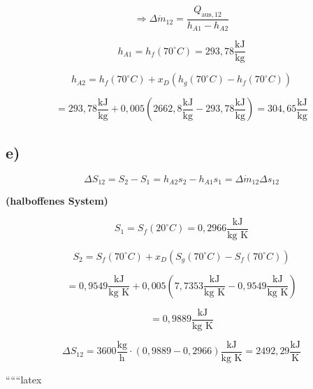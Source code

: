 \[
\Rightarrow \Delta \dot{m}_{12} = \frac{Q_{\text{aus},12}}{h_{A1} - h_{A2}}
\]

\[
h_{A1} = h_f(70^\circ C) = 293{,}78 \frac{\text{kJ}}{\text{kg}}
\]

\[
h_{A2} = h_f(70^\circ C) + x_D \left( h_g(70^\circ C) - h_f(70^\circ C) \right)
\]

\[
= 293{,}78 \frac{\text{kJ}}{\text{kg}} + 0{,}005 \left( 2662{,}8 \frac{\text{kJ}}{\text{kg}} - 293{,}78 \frac{\text{kJ}}{\text{kg}} \right) = 304{,}65 \frac{\text{kJ}}{\text{kg}}
\]

\subsection*{e)}

\[
\Delta S_{12} = S_2 - S_1 = h_{A2} s_2 - h_{A1} s_1 = \Delta \dot{m}_{12} \Delta s_{12}
\]

\textbf{(halboffenes System)}

\[
S_1 = S_f(20^\circ C) = 0{,}2966 \frac{\text{kJ}}{\text{kg K}}
\]

\[
S_2 = S_f(70^\circ C) + x_D \left( S_g(70^\circ C) - S_f(70^\circ C) \right)
\]

\[
= 0{,}9549 \frac{\text{kJ}}{\text{kg K}} + 0{,}005 \left( 7{,}7353 \frac{\text{kJ}}{\text{kg K}} - 0{,}9549 \frac{\text{kJ}}{\text{kg K}} \right)
\]

\[
= 0{,}9889 \frac{\text{kJ}}{\text{kg K}}
\]

\[
\Delta S_{12} = 3600 \frac{\text{kg}}{\text{h}} \cdot (0{,}9889 - 0{,}2966) \frac{\text{kJ}}{\text{kg K}} = 2492{,}29 \frac{\text{kJ}}{\text{K}}
\]

``````latex


